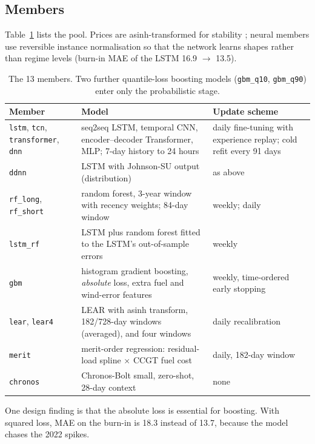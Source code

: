 \documentclass[11pt,a4paper]{article}
\begin{document}
\subsection{Members}
Table~\ref{tab:members} lists the pool. Prices are asinh-transformed for stability \citep{uniejewski2018}; neural members use reversible instance normalisation so that the network learns shapes rather than regime levels (burn-in MAE of the LSTM 16.9 $\to$ 13.5).

\begin{table}[ht]
\centering\small
\begin{tabular}{p{2.5cm}p{6.2cm}p{5.2cm}}
\toprule
Member & Model & Update scheme\\
\midrule
\texttt{lstm}, \texttt{tcn}, \texttt{transformer}, \texttt{dnn} & seq2seq LSTM, temporal CNN, encoder--decoder Transformer, MLP; 7-day history to 24 hours & daily fine-tuning with experience replay; cold refit every 91 days\\
\texttt{ddnn} & LSTM with Johnson-SU output (distribution) & as above\\
\texttt{rf\_long}, \texttt{rf\_short} & random forest, 3-year window with recency weights; 84-day window & weekly; daily\\
\texttt{lstm\_rf} & LSTM plus random forest fitted to the LSTM's out-of-sample errors & weekly\\
\texttt{gbm} & histogram gradient boosting, \emph{absolute} loss, extra fuel and wind-error features & weekly, time-ordered early stopping\\
\texttt{lear}, \texttt{lear4} & LEAR with asinh transform, 182/728-day windows (averaged), and four windows & daily recalibration\\
\texttt{merit} & merit-order regression: residual-load spline $\times$ CCGT fuel cost & daily, 182-day window\\
\texttt{chronos} & Chronos-Bolt small, zero-shot, 28-day context & none\\
\bottomrule
\end{tabular}
\caption{The 13 members. Two further quantile-loss boosting models (\texttt{gbm\_q10}, \texttt{gbm\_q90}) enter only the probabilistic stage.}
\label{tab:members}
\end{table}

One design finding is that the absolute loss is essential for boosting. With squared loss, MAE on the burn-in is 18.3 instead of 13.7, because the model chases the 2022 spikes.
\end{document}
